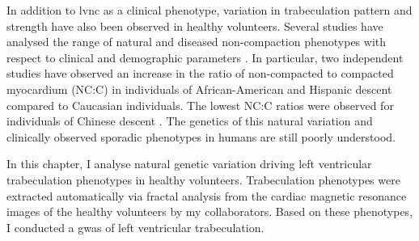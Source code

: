 In addition to \gls{lvnc} as a clinical phenotype, variation in trabeculation pattern and strength have also been observed in healthy volunteers. Several studies have analysed the range of natural and diseased non-compaction phenotypes with respect to clinical and demographic parameters \citep{Petersen2005,Captur2014}.  In particular, two independent studies have observed an increase in the ratio of non-compacted to compacted myocardium (NC:C) in individuals of African-American and Hispanic descent compared to Caucasian individuals. The lowest NC:C ratios were observed for individuals of Chinese descent \citep{Kawel2012,Captur2015}. The genetics of this natural variation and clinically observed sporadic phenotypes in humans are still poorly understood. 

In this chapter, I analyse natural genetic variation driving left ventricular trabeculation phenotypes in healthy volunteers. Trabeculation phenotypes were extracted automatically via fractal analysis from the cardiac magnetic resonance images of the healthy volunteers by my collaborators. Based on these phenotypes, I conducted a \gls{gwas} of left ventricular trabeculation.


